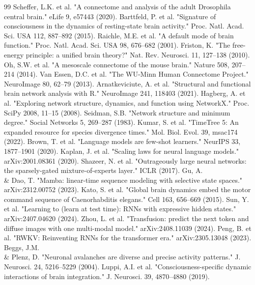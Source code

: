 \documentclass[a4paper,12pt]{article}
\begin{document}
\begin{thebibliography}{99}
 Scheffer, L.K. et al. "A connectome and analysis of the adult Drosophila central brain." eLife 9, e57443 (2020).
 Barttfeld, P. et al. "Signature of consciousness in the dynamics of resting-state brain activity." Proc. Natl. Acad. Sci. USA 112, 887--892 (2015).
 Raichle, M.E. et al. "A default mode of brain function." Proc. Natl. Acad. Sci. USA 98, 676--682 (2001).
 Friston, K. "The free-energy principle: a unified brain theory?" Nat. Rev. Neurosci. 11, 127--138 (2010).
 Oh, S.W. et al. "A mesoscale connectome of the mouse brain." Nature 508, 207--214 (2014).
 Van Essen, D.C. et al. "The WU-Minn Human Connectome Project." NeuroImage 80, 62--79 (2013).
 Arnatkeviciute, A. et al. "Structural and functional brain network analysis with R." NeuroImage 241, 118403 (2021).
 Hagberg, A. et al. "Exploring network structure, dynamics, and function using NetworkX." Proc. SciPy 2008, 11--15 (2008).
 Seidman, S.B. "Network structure and minimum degree." Social Networks 5, 269--287 (1983).
 Kumar, S. et al. "TimeTree 5: An expanded resource for species divergence times." Mol. Biol. Evol. 39, msac174 (2022).
 Brown, T. et al. "Language models are few-shot learners." NeurIPS 33, 1877--1901 (2020).
 Kaplan, J. et al. "Scaling laws for neural language models." arXiv:2001.08361 (2020).
 Shazeer, N. et al. "Outrageously large neural networks: the sparsely-gated mixture-of-experts layer." ICLR (2017).
 Gu, A. \\& Dao, T. "Mamba: linear-time sequence modeling with selective state spaces." arXiv:2312.00752 (2023).
 Kato, S. et al. "Global brain dynamics embed the motor command sequence of Caenorhabditis elegans." Cell 163, 656--669 (2015).
 Sun, Y. et al. "Learning to (learn at test time): RNNs with expressive hidden states." arXiv:2407.04620 (2024).
 Zhou, L. et al. "Transfusion: predict the next token and diffuse images with one multi-modal model." arXiv:2408.11039 (2024).
 Peng, B. et al. "RWKV: Reinventing RNNs for the transformer era." arXiv:2305.13048 (2023).
 Beggs, J.M. \\& Plenz, D. "Neuronal avalanches are diverse and precise activity patterns." J. Neurosci. 24, 5216--5229 (2004).
 Luppi, A.I. et al. "Consciousness-specific dynamic interactions of brain integration." J. Neurosci. 39, 4870--4880 (2019).

\end{thebibliography}
\end{document}
